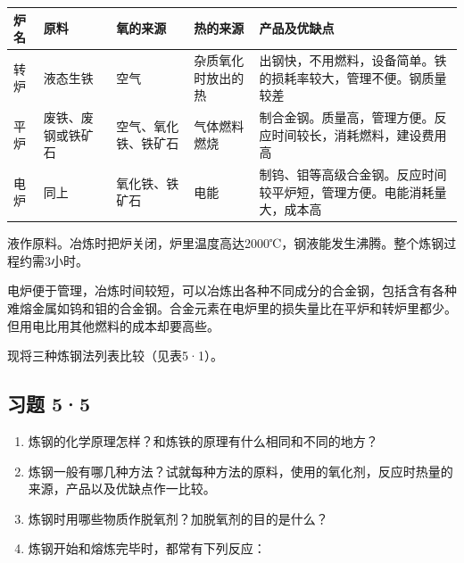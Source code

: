 {\def\LTcaptype{none} %
\begin{longtable}[]{@{}
  >{\raggedright\arraybackslash}p{}
  >{\raggedright\arraybackslash}p{}
  >{\raggedright\arraybackslash}p{}
  >{\raggedright\arraybackslash}p{}
  >{\raggedright\arraybackslash}p{}@{}}
\toprule\noalign{}
\begin{minipage}[b]{\linewidth}\raggedright
炉名
\end{minipage} & \begin{minipage}[b]{\linewidth}\raggedright
原料
\end{minipage} & \begin{minipage}[b]{\linewidth}\raggedright
氧的来源
\end{minipage} & \begin{minipage}[b]{\linewidth}\raggedright
热的来源
\end{minipage} & \begin{minipage}[b]{\linewidth}\raggedright
产品及优缺点
\end{minipage} \\
\midrule\noalign{}
\endhead
\bottomrule\noalign{}
\endlastfoot
转炉 & 液态生铁 & 空气 & 杂质氧化时放出的热 &
出钢快，不用燃料，设备简单。铁的损耗率较大，管理不便。钢质量较差 \\
平炉 & 废铁、废钢或铁矿石 & 空气、氧化铁、铁矿石 & 气体燃料燃烧 &
制合金钢。质量高，管理方便。反应时间较长，消耗燃料，建设费用高 \\
电炉 & 同上 & 氧化铁、铁矿石 & 电能 &
制钨、钼等高级合金钢。反应时间较平炉短，管理方便。电能消耗量大，成本高 \\
\end{longtable}
}

液作原料。冶炼时把炉关闭，炉里温度高达2000℃，钢液能发生沸腾。整个炼钢过程约需3小时。

电炉便于管理，冶炼时间较短，可以冶炼出各种不同成分的合金钢，包括含有各种难熔金属如钨和钼的合金钢。合金元素在电炉里的损失量比在平炉和转炉里都少。但用电比用其他燃料的成本却要高些。

现将三种炼钢法列表比较（见表5·1）。

\subsection{习题 5·5}

\begin{enumerate}
\item
  炼钢的化学原理怎样？和炼铁的原理有什么相同和不同的地方？
\item
  炼钢一般有哪几种方法？试就每种方法的原料，使用的氧化剂，反应时热量的来源，产品以及优缺点作一比较。
\item
  炼钢时用哪些物质作脱氧剂？加脱氧剂的目的是什么？
\item
  炼钢开始和熔炼完毕时，都常有下列反应：
\end{enumerate}

